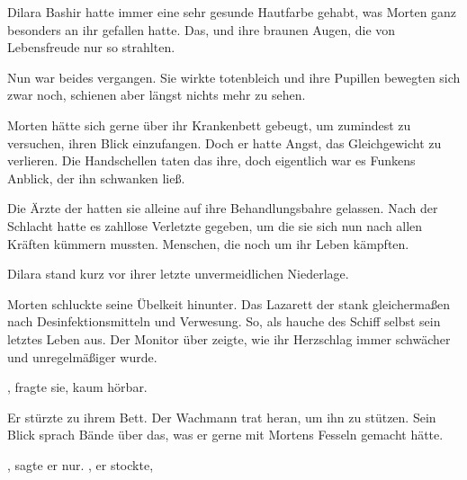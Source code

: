 Dilara Bashir hatte immer eine sehr gesunde Hautfarbe gehabt, was Morten ganz besonders an ihr gefallen hatte. Das, und ihre braunen Augen, die von Lebensfreude nur so strahlten.

\par

Nun war beides vergangen. Sie wirkte totenbleich und ihre Pupillen bewegten sich zwar noch, schienen aber längst nichts mehr zu sehen.

\par

Morten hätte sich gerne über ihr Krankenbett gebeugt, um zumindest zu versuchen, ihren Blick einzufangen. Doch er hatte Angst, das Gleichgewicht zu verlieren. Die Handschellen taten das ihre, doch eigentlich war es Funkens Anblick, der ihn schwanken ließ.

\par

Die Ärzte der  hatten sie alleine auf ihre Behandlungsbahre gelassen. Nach der Schlacht hatte es zahllose Verletzte gegeben, um die sie sich nun nach allen Kräften kümmern mussten. Menschen, die noch um ihr Leben kämpften.

\par

Dilara stand kurz vor ihrer letzte unvermeidlichen Niederlage.

\par

Morten schluckte seine Übelkeit hinunter. Das Lazarett der  stank gleichermaßen nach Desinfektionsmitteln und Verwesung. So, als hauche des Schiff selbst sein letztes Leben aus. Der Monitor über zeigte, wie ihr Herzschlag immer schwächer und unregelmäßiger wurde.

\par

, fragte sie, kaum hörbar.

\par

Er stürzte zu ihrem Bett. Der Wachmann trat heran, um ihn zu stützen. Sein Blick sprach Bände über das, was er gerne mit Mortens Fesseln gemacht hätte.

\par

, sagte er nur. , er stockte, 

\par

